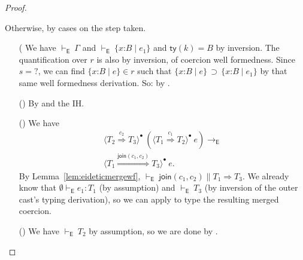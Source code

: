 \documentclass[9pt]{extarticle}
\newcommand{\ottnt}[1]{\mathit{#1}}
\newcommand{\ottsym}[1]{#1}
\begin{document}
\begin{lemma}
\begin{proof}
{\begin{itemize}
      Otherwise, by cases on the step taken.
      \begin{itemize}
      \item[(\E{CoerceStack}] We have $ \mathord{  \vdash _{  \mathsf{E}  } }~ \Gamma $ and $ \mathord{  \vdash _{  \mathsf{E}  } }~  \{ \mathit{x} \mathord{:} \ottnt{B} \mathrel{\mid} \ottnt{e_{{\mathrm{1}}}} \}  $ and $ \mathsf{ty} ( \ottnt{k} )   \ottsym{=}  \ottnt{B}$ by inversion. The
        quantification over $\ottnt{r}$ is also by inversion, of coercion
        well formedness. Since $\ottnt{s}  \ottsym{=}   \mathord{?} $, we can find $ \{ \mathit{x} \mathord{:} \ottnt{B} \mathrel{\mid} \ottnt{e} \} \in  \ottnt{r} $ such that $ \{ \mathit{x} \mathord{:} \ottnt{B} \mathrel{\mid} \ottnt{e} \}  \, \supset \,  \{ \mathit{x} \mathord{:} \ottnt{B} \mathrel{\mid} \ottnt{e_{{\mathrm{1}}}} \} $ by that same well
        formedness derivation. So: by .
      \item[(\E{CoerceInner})] By  and the IH.
      \item[(\E{CastMerge})] We have \[ \begin{array}{l}
           \langle  \ottnt{T_{{\mathrm{2}}}}  \mathord{ \overset{ \ottnt{c_{{\mathrm{2}}}} }{\Rightarrow} }  \ottnt{T_{{\mathrm{3}}}}  \rangle^{\bullet} ~   (  \langle  \ottnt{T_{{\mathrm{1}}}}  \mathord{ \overset{ \ottnt{c_{{\mathrm{1}}}} }{\Rightarrow} }  \ottnt{T_{{\mathrm{2}}}}  \rangle^{\bullet} ~  \ottnt{e}  )    \longrightarrow _{  \mathsf{E}  }  {} \\
           \langle  \ottnt{T_{{\mathrm{1}}}}  \mathord{ \overset{  \mathsf{join} ( \ottnt{c_{{\mathrm{1}}}} , \ottnt{c_{{\mathrm{2}}}} )  }{\Rightarrow} }  \ottnt{T_{{\mathrm{3}}}}  \rangle^{\bullet} ~  \ottnt{e} . \end{array} \]
By Lemma~\ref{lem:eideticmergewf}, $ \mathord{  \vdash _{  \mathsf{E}  } }~  \mathsf{join} ( \ottnt{c_{{\mathrm{1}}}} , \ottnt{c_{{\mathrm{2}}}} )    \mathrel{\parallel}   \ottnt{T_{{\mathrm{1}}}}  \Rightarrow  \ottnt{T_{{\mathrm{3}}}} $. We already know that $ \emptyset   \vdash _{  \mathsf{E}  }  \ottnt{e_{{\mathrm{1}}}}  :  \ottnt{T_{{\mathrm{1}}}} $ (by
        assumption) and $ \mathord{  \vdash _{  \mathsf{E}  } }~ \ottnt{T_{{\mathrm{3}}}} $ (by inversion of the outer cast's
        typing derivation), so we can apply  to type the
        resulting merged coercion.
      \item[(\E{CoerceRaise})] We have $ \mathord{  \vdash _{  \mathsf{E}  } }~ \ottnt{T_{{\mathrm{2}}}} $ by assumption, so we
        are done by .
      \end{itemize}


\end{itemize}}
\end{proof}
\end{lemma}
\end{document}
